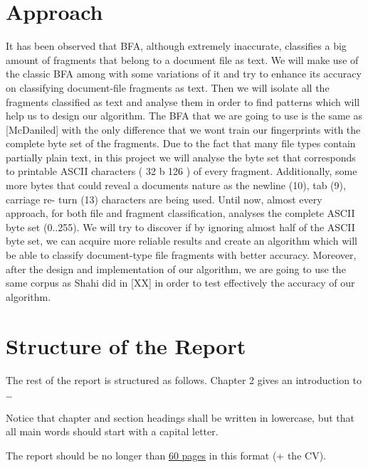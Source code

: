 \section{Approach}
 It has been observed that BFA, although extremely inaccurate, classifies a big amount of fragments that belong to a document file as text. We will make use of the classic BFA among with some variations of it and try to enhance its accuracy on classifying document-file fragments as text. Then we will isolate all the fragments classified as text and analyse them in order to find patterns which will help us to design our algorithm. The BFA that we are going to use is the same as [McDaniled] with the only difference that we wont train our fingerprints with the complete byte set of the fragments. Due to the fact that many file types contain partially plain text, in this
project we will analyse the byte set that corresponds to printable ASCII
characters ( 32  b  126 ) of every fragment. Additionally, some more bytes
that could reveal a documents nature as the newline (10), tab (9), carriage re-
turn (13) characters are being used. Until now, almost
every approach, for both file and fragment classification, analyses the complete ASCII byte set (0..255). We will try to discover if by ignoring
almost half of the ASCII byte set, we can acquire more reliable results and create an algorithm which will be able to classify document-type file fragments with better accuracy. Moreover, after the design and implementation of our algorithm, we are going to use
the same corpus as Shahi did in [XX] in order to test effectively the accuracy of our algorithm. 



\section{Structure of the Report}
The rest of the report is structured as follows. Chapter 2 gives an introduction to \ldots

\begin{remark}
Notice that chapter and section headings shall be written in lowercase, but that all main words should start with a capital letter.
\end{remark}


The report should be no longer than \underline{60 pages} in this format (+ the CV).
